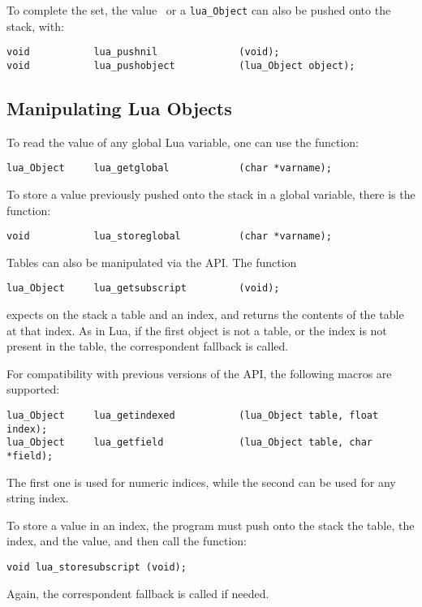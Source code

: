 To complete the set,
the value \nil\ or a \verb'lua_Object' can also be pushed onto the stack,
with:
\begin{verbatim}
void           lua_pushnil              (void);
void           lua_pushobject           (lua_Object object);
\end{verbatim}


\subsection{Manipulating Lua Objects}
To read the value of any global Lua variable,
one can use the function:
\begin{verbatim}
lua_Object     lua_getglobal            (char *varname);
\end{verbatim}
To store a value previously pushed onto the stack in a global variable,
there is the function:
\begin{verbatim}
void           lua_storeglobal          (char *varname);
\end{verbatim}

Tables can also be manipulated via the API.
The function
\begin{verbatim}
lua_Object     lua_getsubscript         (void);
\end{verbatim}
expects on the stack a table and an index,
and returns the contents of the table at that index.
As in Lua, if the first object is not a table,
or the index is not present in the table,
the correspondent fallback is called.

For compatibility with previous versions of the API,
the following macros are supported:
\begin{verbatim}
lua_Object     lua_getindexed           (lua_Object table, float index);
lua_Object     lua_getfield             (lua_Object table, char *field);
\end{verbatim}
The first one is used for numeric indices,
while the second can be used for any string index.

To store a value in an index,
the program must push onto the stack the table, the index,
and the value,
and then call the function:
\begin{verbatim}
void lua_storesubscript (void);
\end{verbatim}
Again, the correspondent fallback is called if needed.

